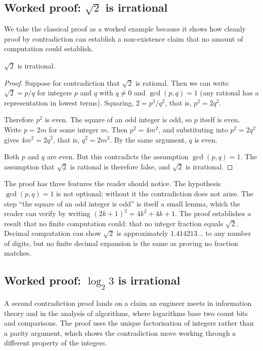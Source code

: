 \subsection{Worked proof: $\sqrt{2}$ is irrational}

We take the classical proof as a worked example because it shows
how cleanly proof by contradiction can establish a non-existence
claim that no amount of computation could establish.

\begin{theorem}
$\sqrt{2}$ is irrational.
\end{theorem}

\begin{proof}
Suppose for contradiction that $\sqrt{2}$ is rational. Then we can
write $\sqrt{2} = p/q$ for integers $p$ and $q$ with $q \neq 0$ and
$\gcd(p, q) = 1$ (any rational has a representation in lowest
terms). Squaring, $2 = p^{2}/q^{2}$, that is, $p^{2} = 2 q^{2}$.

Therefore $p^{2}$ is even. The square of an odd integer is odd, so
$p$ itself is even. Write $p = 2 m$ for some integer $m$. Then
$p^{2} = 4 m^{2}$, and substituting into $p^{2} = 2 q^{2}$ gives
$4 m^{2} = 2 q^{2}$, that is, $q^{2} = 2 m^{2}$. By the same
argument, $q$ is even.

Both $p$ and $q$ are even. But this contradicts the assumption
$\gcd(p, q) = 1$. The assumption that $\sqrt{2}$ is rational is
therefore false, and $\sqrt{2}$ is irrational.
\end{proof}

The proof has three features the reader should notice. The
hypothesis $\gcd(p, q) = 1$ is not optional; without it the
contradiction does not arise. The step ``the square of an odd
integer is odd'' is itself a small lemma, which the reader can
verify by writing $(2k+1)^{2} = 4k^{2} + 4k + 1$. The proof
establishes a result that no finite computation could: that no
integer fraction equals $\sqrt{2}$. Decimal computation can show
$\sqrt{2}$ is approximately $1.414213\ldots$ to any number of
digits, but no finite decimal expansion is the same as proving no
fraction matches.

\subsection{Worked proof: $\log_{2} 3$ is irrational}

A second contradiction proof lands on a claim an engineer meets in
information theory and in the analysis of algorithms, where logarithms
base two count bits and comparisons. The proof uses the unique
factorisation of integers rather than a parity argument, which shows the
contradiction move working through a different property of the integers.

